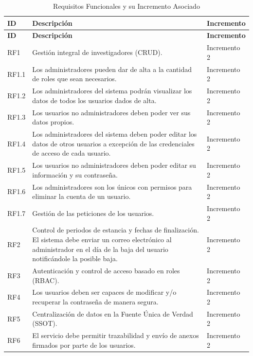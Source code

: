 \begin{center}
\begin{longtable}{lp{8cm}l}  %
\caption{Requisitos Funcionales y su Incremento Asociado}
\label{tab:rf_simple} \\
\toprule
\textbf{ID} & \textbf{Descripción} & \textbf{Incremento} \\
\midrule
\endfirsthead

\toprule
\textbf{ID} & \textbf{Descripción} & \textbf{Incremento} \\
\midrule
\endhead

\bottomrule
\endfoot

RF1   & Gestión integral de investigadores (CRUD). & Incremento 2 \\
RF1.1 & Los administradores pueden dar de alta a la cantidad de roles que sean necesarios. & Incremento 2 \\
RF1.2 & Los administradores del sistema podrán visualizar los datos de todos los usuarios dados de alta. & Incremento 2 \\
RF1.3 & Los usuarios no administradores deben poder ver sus datos propios. & Incremento 2 \\
RF1.4 & Los administradores del sistema deben poder editar los datos de otros usuarios a excepción de las credenciales de acceso de cada usuario. & Incremento 2 \\
RF1.5 & Los usuarios no administradores deben poder editar su información y su contraseña. & Incremento 2 \\
RF1.6 & Los administradores son los únicos con permisos para eliminar la cuenta de un usuario. & Incremento 2 \\
RF1.7 & Gestión de las peticiones de los usuarios. & Incremento 2 \\
RF2   & Control de periodos de estancia y fechas de finalización. El sistema debe enviar un correo electrónico al administrador en el día de la baja del usuario notificándole la posible baja. & Incremento 2 \\
RF3   & Autenticación y control de acceso basado en roles (RBAC). & Incremento 2 \\
RF4   & Los usuarios deben ser capaces de modificar y/o recuperar la contraseña de manera segura. & Incremento 2 \\
RF5   & Centralización de datos en la Fuente Única de Verdad (SSOT). & Incremento 2 \\
RF6   & El servicio debe permitir trazabilidad y envío de anexos firmados por parte de los usuarios. & Incremento 2 \\

\end{longtable}
\end{center}
